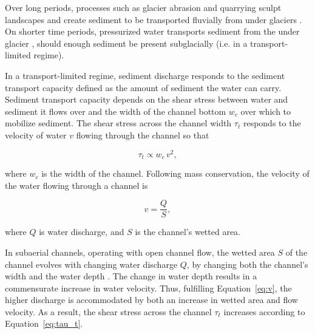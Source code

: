 \documentclass[11pt]{article}
\newcommand{\mauro}[1]{{\textbf{\color{green}Mauro says:} \color{green} #1} }
\begin{document}
Over long periods, processes such as glacier abrasion and quarrying sculpt landscapes and create sediment to be transported fluvially from under glaciers \citep[c.f.][]{hallet1979,iverson2012,ugelvig2018}.
On shorter time periods, pressurized water transports sediment from the under glacier \citep{walder1994,creyts2013,beaud2018,delaney2019}, should enough sediment be present subglacially (i.e. in a transport-limited regime).

In a transport-limited regime, sediment discharge responds to the sediment transport capacity defined as the amount of sediment the water can carry.
Sediment transport capacity depends on the shear stress between water and sediment it flows  over \citep{shields1936,meyer1948,engelund1967} and the width of the channel bottom $w_c$ over which to mobilize sediment.
The shear stress  across the channel width $\tau_t$ responds to the velocity of water $v$ flowing through the channel so that
\begin{linenomath*}
  \begin{equation}
    \label{eq:tau_t}
    \tau_t \propto w_c\, v^2,
  \end{equation}
\end{linenomath*}
%
where $w_c$ is the width of the channel. Following mass conservation, the velocity of the water flowing through a  channel is 
\begin{linenomath*}
  \begin{equation}
    \label{eq:v}
    v = \frac{Q}{S},
  \end{equation}
\end{linenomath*}
where $Q$ is water discharge,  and $S$ is the channel's wetted area. %

In subaerial channels, operating with open channel flow, the wetted area $S$ of the channel evolves with changing water discharge $Q$, by changing both the channel's width and the water depth \citep{leopold1953}.  The change in water depth results in a commensurate increase in water velocity.  Thus,  fulfilling Equation~\eqref{eq:v}, the higher discharge is accommodated by both an increase in wetted area and flow velocity. As a result, the shear stress across the channel $\tau_t$ increases according to Equation~\ref{eq:tau_t}.
\end{document}

